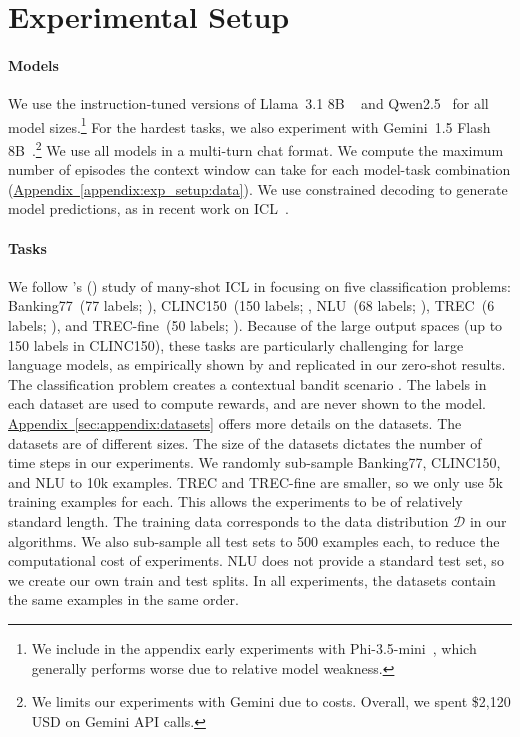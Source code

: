 \documentclass{article}
\theoremstyle{plain}
\theoremstyle{definition}
\theoremstyle{remark}
\newcommand{\aautoref}[1]{\hyperref[#1]{Appendix~\ref*{#1}}}
\newcommand{\datadist}{\mathcal{D}}
\newcommand{\llama}{Llama\xspace}
\newcommand{\phillm}{Phi\xspace}
\newcommand{\qwen}{Qwen\xspace}
\newcommand{\gemini}{Gemini\xspace}
\newcommand{\banking}{Banking77\xspace}
\newcommand{\clinic}{CLINC150\xspace}
\newcommand{\trec}{TREC\xspace}
\newcommand{\trecfine}{TREC-fine\xspace}
\newcommand{\nlu}{NLU\xspace}
\begin{document}
\section{Experimental Setup}\label{sec:exp}
\paragraph{Models}
We use the instruction-tuned versions of \llama{}~3.1 8B ~\citep{dubey2024llama} and \qwen{2.5}~\citep{qwen2024qwen25} for all model sizes.\footnote{We include in the appendix early experiments with  \phillm{}-3.5-mini~\citep{abdin2024phi3technicalreporthighly}, which generally performs worse due to relative model weakness.}
For the hardest tasks, we also experiment with \gemini~1.5 Flash 8B~\citep{geminiteam2024geminifamilyhighlycapable}.\footnote{We limits our experiments with \gemini due to costs. Overall, we spent \$2{,}120 USD on \gemini API calls.}
We use all models in a multi-turn chat format.
We compute the maximum number of episodes the context window can take for each model-task combination (\aautoref{appendix:exp_setup:data}).
We use constrained decoding to generate model predictions, as in recent work on ICL~\citep{bertsch2024incontext}.
\paragraph{Tasks}
We follow \citeauthor{bertsch2024incontext}'s (\citeyear{bertsch2024incontext}) study of many-shot ICL in focusing on five classification problems: \banking~(77 labels; \citealp{Casanueva2020}), \clinic~(150 labels; \citealp{larson-etal-2019-evaluation}, \nlu~(68 labels; \citealp{Liu2021}), \trec~(6 labels; \citealp{li-roth-2002-learning, hovy-etal-2001-toward}), and \trecfine~(50 labels; \citealp{li-roth-2002-learning, hovy-etal-2001-toward}).
Because of the large output spaces (up to 150 labels in \clinic), these tasks are particularly challenging for large language models, as empirically shown by \citet{bertsch2024incontext} and replicated in our zero-shot results.
The classification problem creates a contextual bandit scenario \citep{pmlr-v97-zhang19b, bietti2021contextual}. The labels in each dataset are used to compute rewards, and are never shown to the model.
\aautoref{sec:appendix:datasets} offers more details on the datasets.
The datasets are of different sizes.
The size of the datasets dictates the number of time steps in our experiments.
We randomly sub-sample \banking, \clinic, and \nlu to 10k examples.
\trec and \trecfine are smaller, so we only use 5k training examples for each.
This allows the experiments to be of relatively standard length.
The training data corresponds to the data distribution $\datadist$ in our algorithms.
We also sub-sample all test sets to 500 examples each, to reduce the computational cost of experiments.
\nlu does not provide a standard test set, so we create our own train and test splits.
In all experiments, the datasets contain the same examples in the same order.
\end{document}
